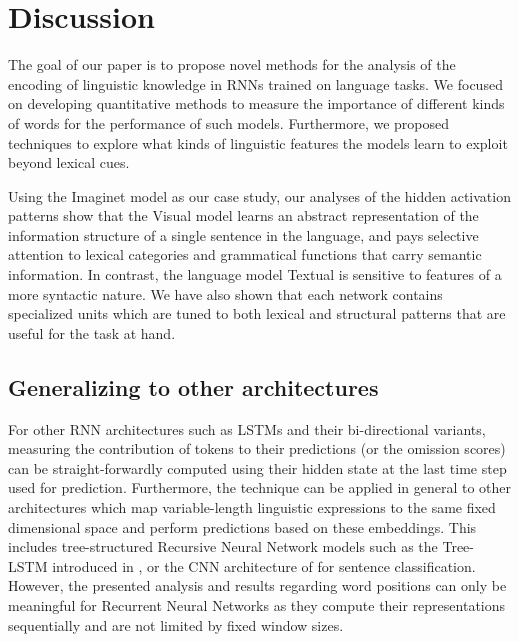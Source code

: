 \section{Discussion}
\label{sec:conclusion}

The goal of our paper is to propose novel methods for the 
analysis of the encoding of linguistic knowledge in RNNs trained on language tasks.
We focused on developing quantitative methods to measure the importance
of different kinds of words for the performance of such models. Furthermore, we
proposed techniques to explore what kinds of linguistic features the models
learn to exploit beyond lexical cues.

Using the {\sc Imaginet} model as our case study,
our analyses of the hidden activation patterns show that the {\sc Visual} model
learns an abstract representation of the information structure of a single
sentence in the language, and pays selective attention to lexical categories and
grammatical functions that carry semantic information. In contrast,
the language model {\sc Textual} is sensitive to features of a more
syntactic nature. We have also shown that each network contains
specialized units which are tuned to both lexical and structural
patterns that are useful for the task at hand.  


\subsection{Generalizing to other architectures}


For other RNN architectures such as LSTMs \label{edit:omitgeneral}
and their bi-directional variants, measuring the contribution
of tokens to their predictions (or the omission scores)
can be straight-forwardly computed using their hidden state 
at the last time step used for prediction. Furthermore, the technique 
can be applied in general to other architectures which
map variable-length linguistic expressions to the same fixed dimensional
space and perform predictions based on these embeddings. 
This includes tree-structured Recursive Neural Network models such as the Tree-LSTM
introduced in , or the CNN architecture of  
for sentence classification. 
However,
the presented analysis and results regarding word positions can only be meaningful
for Recurrent Neural Networks as they compute their representations sequentially and are not
limited by fixed window sizes.

